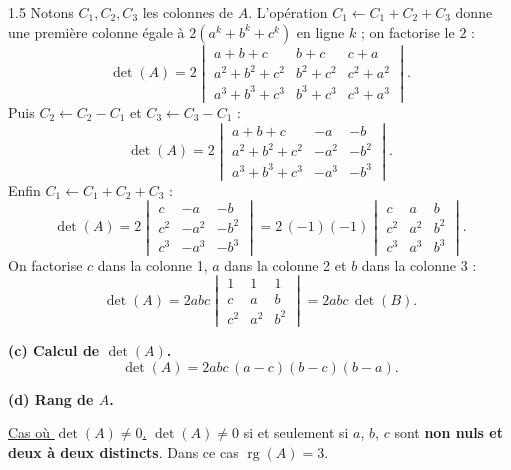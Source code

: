 \documentclass[12pt]{article}
\begin{document}
\begin{spacing}{1.5}
Notons $C_1,C_2,C_3$ les colonnes de $A$. L'opération $C_1\leftarrow C_1+C_2+C_3$ donne une première colonne égale à $2(a^k+b^k+c^k)$ en ligne $k$ ; on factorise le $2$ :
\[
\det(A)=2\begin{vmatrix}
a+b+c & b+c & c+a \\
a^2+b^2+c^2 & b^2+c^2 & c^2+a^2 \\
a^3+b^3+c^3 & b^3+c^3 & c^3+a^3
\end{vmatrix}.
\]
Puis $C_2\leftarrow C_2-C_1$ et $C_3\leftarrow C_3-C_1$ :
\[
\det(A)=2\begin{vmatrix}
a+b+c & -a & -b \\
a^2+b^2+c^2 & -a^2 & -b^2 \\
a^3+b^3+c^3 & -a^3 & -b^3
\end{vmatrix}.
\]
Enfin $C_1\leftarrow C_1+C_2+C_3$ :
\[
\det(A)=2\begin{vmatrix}
c & -a & -b \\
c^2 & -a^2 & -b^2 \\
c^3 & -a^3 & -b^3
\end{vmatrix}
=2\,(-1)(-1)\begin{vmatrix}
c & a & b \\
c^2 & a^2 & b^2 \\
c^3 & a^3 & b^3
\end{vmatrix}.
\]
On factorise $c$ dans la colonne 1, $a$ dans la colonne 2 et $b$ dans la colonne 3 :
\[
\det(A)=2abc\begin{vmatrix}
1 & 1 & 1 \\
c & a & b \\
c^2 & a^2 & b^2
\end{vmatrix}=2abc\,\det(B).
\]

\textbf{(c) Calcul de $\det(A)$.}
\[
\boxed{\det(A)=2abc\,(a-c)(b-c)(b-a)}.
\]

\textbf{(d) Rang de $A$.}

\underline{Cas où $\det(A)\neq0$.} $\det(A)\neq 0$ si et seulement si $a$, $b$, $c$ sont \textbf{non nuls et deux à deux distincts}. Dans ce cas $\operatorname{rg}(A)=3$.


\end{spacing}
\end{document}
